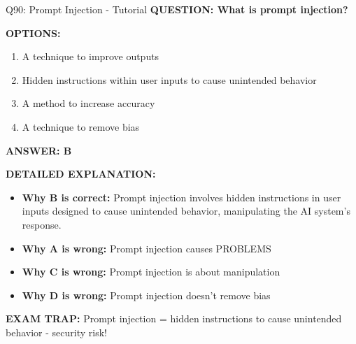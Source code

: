 \documentclass[8pt]{beamer}
\begin{document}
	\begin{frame}{Q90: Prompt Injection - Tutorial}
		\fontsize{6.5}{7.5}\selectfont
		\textbf{QUESTION: What is prompt injection?}
		
		\vspace{0.1cm}
		\textbf{OPTIONS:}
		\begin{enumerate}
			\item A technique to improve outputs
			\item Hidden instructions within user inputs to cause unintended behavior
			\item A method to increase accuracy
			\item A technique to remove bias
		\end{enumerate}
		
		\vspace{0.1cm}
		\textcolor{myblue}{\textbf{ANSWER: B}}
		
		\vspace{0.1cm}
		\textbf{DETAILED EXPLANATION:}
		\begin{itemize}
			\item \textbf{Why B is correct:} Prompt injection involves hidden instructions in user inputs designed to cause unintended behavior, manipulating the AI system's response.
			\item \textbf{Why A is wrong:} Prompt injection causes PROBLEMS
			\item \textbf{Why C is wrong:} Prompt injection is about manipulation
			\item \textbf{Why D is wrong:} Prompt injection doesn't remove bias
		\end{itemize}
		
		\textcolor{myred}{\textbf{EXAM TRAP:}} Prompt injection = \textcolor{myblue}{hidden instructions to cause unintended behavior} - security risk!
	\end{frame}
	
\end{document}
